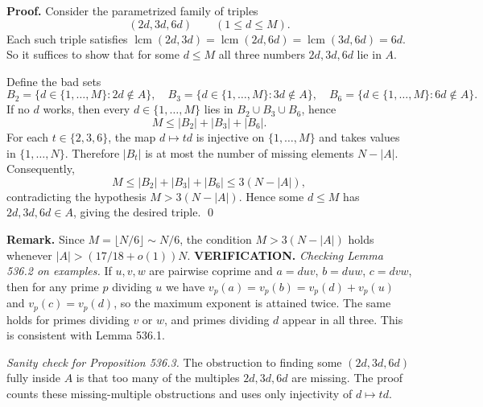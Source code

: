 \textbf{Proof.}
Consider the parametrized family of triples
\[
(2d,3d,6d)\qquad (1\le d\le M).
\]
Each such triple satisfies $\operatorname{lcm}(2d,3d)=\operatorname{lcm}(2d,6d)=\operatorname{lcm}(3d,6d)=6d$.
So it suffices to show that for some $d\le M$ all three numbers $2d,3d,6d$ lie in $A$.

Define the bad sets
\[
B_2=\{d\in\{1,\dots,M\}:2d\notin A\},\quad
B_3=\{d\in\{1,\dots,M\}:3d\notin A\},\quad
B_6=\{d\in\{1,\dots,M\}:6d\notin A\}.
\]
If no $d$ works, then every $d\in\{1,\dots,M\}$ lies in $B_2\cup B_3\cup B_6$, hence
\[
M\le |B_2|+|B_3|+|B_6|.
\]
For each $t\in\{2,3,6\}$, the map $d\mapsto td$ is injective on $\{1,\dots,M\}$ and takes values in $\{1,\dots,N\}$. Therefore $|B_t|$ is at most the number of missing elements $N-|A|$.
Consequently,
\[
M\le |B_2|+|B_3|+|B_6|\le 3(N-|A|),
\]
contradicting the hypothesis $M>3(N-|A|)$.
Hence some $d\le M$ has $2d,3d,6d\in A$, giving the desired triple. \qed

\textbf{Remark.}
Since $M=\lfloor N/6\rfloor\sim N/6$, the condition $M>3(N-|A|)$ holds whenever $|A|>(17/18+o(1))N$.
\noindent\textbf{VERIFICATION.}
\emph{Checking Lemma 536.2 on examples.} If $u,v,w$ are pairwise coprime and $a=d u v$, $b=d u w$, $c=d v w$, then for any prime $p$ dividing $u$ we have $v_p(a)=v_p(b)=v_p(d)+v_p(u)$ and $v_p(c)=v_p(d)$, so the maximum exponent is attained twice. The same holds for primes dividing $v$ or $w$, and primes dividing $d$ appear in all three. This is consistent with Lemma 536.1.

\emph{Sanity check for Proposition 536.3.} The obstruction to finding some $(2d,3d,6d)$ fully inside $A$ is that too many of the multiples $2d,3d,6d$ are missing. The proof counts these missing-multiple obstructions and uses only injectivity of $d\mapsto td$.

